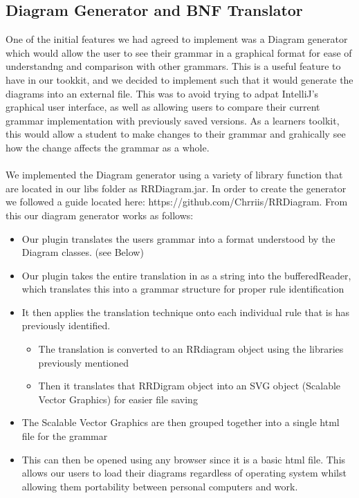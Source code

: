 \subsection{Diagram Generator and BNF Translator}
One of the initial features we had agreed to implement was a Diagram generator which would allow the user to see their grammar in a graphical format for ease of understandng and comparison with other grammars. This is a useful feature to have in our tookkit, and we decided to implement such that it would generate the diagrams into an external file. This was to avoid trying to adpat IntelliJ's graphical user interface, as well as allowing users to compare their current grammar implementation with previously saved versions. As a learners toolkit, this would allow a student to make changes to their grammar and grahically see how the change affects the grammar as a whole.\\
\\
We implemented the Diagram generator using a variety of library function that are located in our libs folder as RRDiagram.jar. In order to create the generator we followed a guide located here: https://github.com/Chrriis/RRDiagram.
From this our diagram generator works as follows:
\begin{itemize}
\item Our plugin translates the users grammar into a format understood by the Diagram classes. (see Below)
\item Our plugin takes the entire translation in as a string into the bufferedReader, which translates this into a grammar structure for proper rule identification
\item It then applies the translation technique onto each individual rule that is has previously identified. 
	\begin{itemize}
	\item The translation is converted to an RRdiagram object using the libraries previously mentioned
	\item Then it translates that RRDigram object into an SVG object (Scalable Vector Graphics) for easier file saving
	\end{itemize}
\item The Scalable Vector Graphics are then grouped together into a single html file for the grammar
\item This can then be opened using any browser since it is a basic html file. This allows our users to load their diagrams regardless of operating system whilst allowing them portability between personal computers and work. 
\end{itemize}


